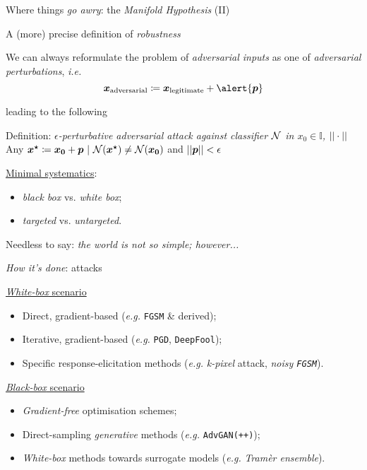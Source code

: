 {\begin{frame}{ Where things \textit{go awry}: the \textit{Manifold Hypothesis} (II)}
    \end{frame}

    \begin{frame}{ A (more) precise definition of \textit{robustness}}

        We can always reformulate the problem of \textit{adversarial inputs} as one of \textit{\alert{adversarial perturbations}}, \textit{i.e.}
        $$ \vec{x}_{\text{adversarial}} \coloneq  \vec{x}_{\text{legitimate}} + \alert{\vec{p}}$$

        leading to the following

        \begin{block}{Definition: \textit{\alert{$\epsilon$}-perturbative adversarial attack against classifier $\mathcal{N}$ in $x_0 \in \mathbb{I}$, \wrt $||\cdot||$}}
            Any $\bm{x^{\star}} \coloneq \bm{x_0} + \bm{p} \text{ | } \mathcal{N}(\bm{x^{\star}}) \neq \mathcal{N}(\bm{x_0})$ and $||\bm{p}|| < \epsilon$
        \end{block}

    \underline{Minimal systematics}:
    \begin{itemize}
        \item \textit{black box} vs. \textit{\alert{white box}};
        \item \textit{targeted} vs. \textit{\alert{untargeted}}.
    \end{itemize}

    Needless to say: \textit{the world is not so simple; however...}
    \end{frame}

    \begin{frame}{ \textit{How it's done}: attacks}

        \underline{\textit{White-box} scenario}
        \begin{itemize}
            \item Direct, \alert{gradient}-based (\textit{e.g.} \texttt{FGSM} \& derived);
            \item Iterative, \alert{gradient}-based (\textit{e.g.} \texttt{PGD}, \texttt{DeepFool});
            \item Specific response-elicitation methods (\textit{e.g.} \textit{k-pixel} attack, \textit{noisy \texttt{FGSM}}).
        \end{itemize}

        \underline{\textit{Black-box} scenario}
        \begin{itemize}
            \item \textit{Gradient-free} optimisation schemes;
            \item Direct-sampling \textit{generative} methods (\textit{e.g.} \texttt{AdvGAN(++)});
            \item \textit{White-box} methods towards \alert{surrogate} models (\textit{e.g.} \textit{Tramèr ensemble}).
        \end{itemize}


\end{frame}}
